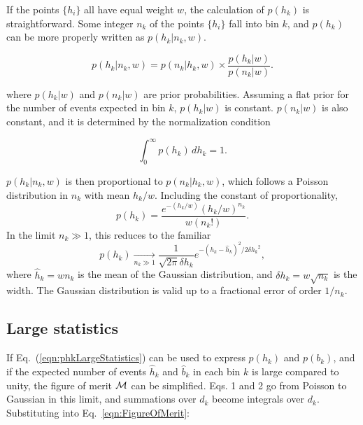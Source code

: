 \documentclass[twocolumn,twoside,prd]{revtex4} %
\newcommand {\expBK}[1]{e^{#1}}
\begin{document}
If the points $\{ h_i \}$ all have equal weight $w$, the calculation of $p(h_k)$ is straightforward.  Some integer $n_k$ of the points $\{ h_i \}$ fall into bin $k$, and $p(h_k)$ can be more properly written as $p(h_k|n_k,w)$. 

\begin{equation}
p(h_k|n_k,w) = p(n_k|h_k,w) \times \frac{p(h_k|w)}{p(n_k|w)}.
\end{equation}

where $p(h_k|w)$ and $p(n_k|w)$ are prior probabilities.  Assuming a flat prior for the number of events expected in bin $k$, $p(h_k|w)$ is constant.  $p(n_k|w)$ is also constant, and it is determined by the normalization condition

\[
\int_0^\infty p(h_k)\,d{h_k} = 1.
\]

$p(h_k|n_k,w)$ is then proportional to $p(n_k|h_k,w)$, which follows a Poisson distribution in $n_k$ with mean $h_k/w$.  Including the constant of proportionality,
\begin{equation}
p(h_k) = \frac{ e^{-(h_k/w)} (h_k/w)^{n_k} }{ w (n_k!) }.
\end{equation}
In the limit $n_k \gg 1$, this reduces to the familiar
\begin{equation}
\label{eqn:phkLargeStatistics}
p(h_k) \xrightarrow[n_k \gg 1]{} \frac{1}{\sqrt{2\pi}{\delta h_k}} \expBK{ - ( h_k - \hat h_k )^2 / 2 {\delta h_k}^2 },
\end{equation}
where $\hat h_k = w n_k$ is the mean of the Gaussian distribution, and $\delta h_k = w \sqrt{n_k}$ is the width.  The Gaussian distribution is valid up to a fractional error of order $1/{n_k}$. 

\subsection{Large statistics}

If Eq.~(\ref{eqn:phkLargeStatistics}) can be used to express $p(h_k)$ and $p(b_k)$, and if the expected number of events $\hat h_k$ and $\hat b_k$ in each bin $k$ is large compared to unity, the figure of merit ${\cal M}$ can be simplified.  Eqs. 1 and 2 go from Poisson to Gaussian in this limit, and summations over $d_k$ become integrals over $d_k$.   Substituting into Eq.~\ref{eqn:FigureOfMerit}:
\end{document}
